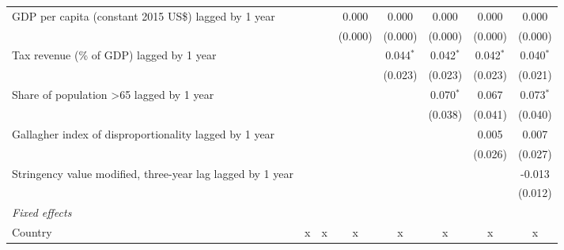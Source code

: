 \begin{tabular}{lccccccc}
   GDP per capita (constant 2015 US\$) lagged by 1 year                                          &              &             & 0.000        & 0.000       & 0.000       & 0.000       & 0.000\\   
                                                                                                 &              &             & (0.000)      & (0.000)     & (0.000)     & (0.000)     & (0.000)\\   
   Tax revenue (\% of GDP) lagged by 1 year                                                      &              &             &              & 0.044$^{*}$ & 0.042$^{*}$ & 0.042$^{*}$ & 0.040$^{*}$\\   
                                                                                                 &              &             &              & (0.023)     & (0.023)     & (0.023)     & (0.021)\\   
   Share of population >65 lagged by 1 year                                                      &              &             &              &             & 0.070$^{*}$ & 0.067       & 0.073$^{*}$\\   
                                                                                                 &              &             &              &             & (0.038)     & (0.041)     & (0.040)\\   
   Gallagher index of disproportionality lagged by 1 year                                        &              &             &              &             &             & 0.005       & 0.007\\   
                                                                                                 &              &             &              &             &             & (0.026)     & (0.027)\\   
   Stringency value modified, three-year lag lagged by 1 year                                    &              &             &              &             &             &             & -0.013\\   
                                                                                                 &              &             &              &             &             &             & (0.012)\\   
   \emph{Fixed effects}\\
   Country                                                                                       & x            & x           & x            & x           & x           & x           & x\\  

\end{tabular}
